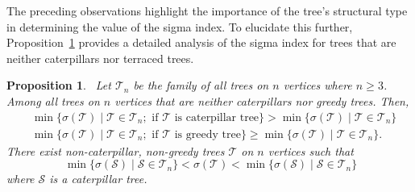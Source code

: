 \documentclass[12pt, a4paper]{article}
\theoremstyle{plain}  %
\newtheorem{proposition}{Proposition}[section]
\theoremstyle{definition}  %
\newcommand{\TT}{\mathcal{T}}
\newcommand{\TS}{\mathcal{S}}
\begin{document}
The preceding observations highlight the importance of the tree's structural type in determining the value of the sigma index. To elucidate this further, Proposition~\ref{TmuDisu01min} provides a detailed analysis of the sigma index for trees that are neither caterpillars nor terraced trees.

\begin{proposition}~\label{TmuDisu01min}
Let $\mathcal{T}_n$ be the family of all trees on $n$ vertices where $n \geq 3$.
Among all trees on $n$ vertices that are neither caterpillars nor greedy trees. Then, 
\begin{align*}
&\min\{\sigma(\TT)\mid \TT\in \mathcal{T}_n; \text{ if } \TT \text{ is caterpillar tree}\}>\min\{\sigma(\TT)\mid \TT\in \mathcal{T}_n\}\\
&\min\{\sigma(\TT)\mid \TT\in \mathcal{T}_n; \text{ if } \TT \text{ is greedy tree}\}\geqslant \min\{\sigma(\TT)\mid \TT\in \mathcal{T}_n\}.
\end{align*}
 There exist non-caterpillar, non-greedy trees $\TT$ on $n$ vertices such that
 \begin{equation}~\label{eqq1TmuDisu01min}
\min\bigl\{\sigma(\TS)\mid \TS\in\mathcal{T}_n\bigr\}<\sigma(\TT)<\min\bigl\{\sigma(\TS)\mid \TS\in\mathcal{T}_n\bigr\} 
 \end{equation}
 where $\TS$ is a caterpillar tree.
\end{proposition}
\end{document}
